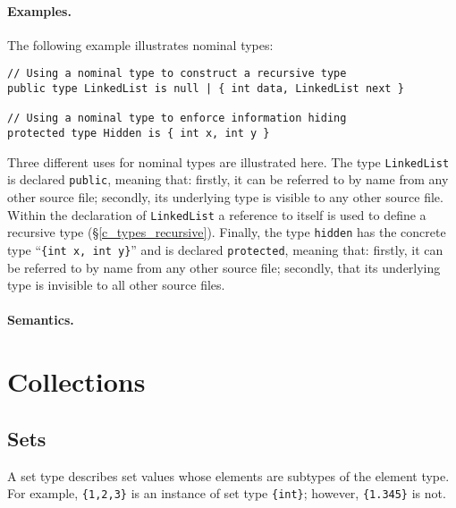 \paragraph{Examples.}  The following example illustrates nominal types:
\begin{lstlisting}
// Using a nominal type to construct a recursive type
public type LinkedList is null | { int data, LinkedList next }

// Using a nominal type to enforce information hiding
protected type Hidden is { int x, int y }
\end{lstlisting}
Three different uses for nominal types are illustrated here.  The type \lstinline{LinkedList} is declared \lstinline{public}, meaning that: firstly, it can be referred to by name from any other source file; secondly, its underlying type is visible to any other source file.  Within the declaration of \lstinline{LinkedList} a reference to itself is used to define a recursive type (\S\ref{c_types_recursive}).  Finally, the type \lstinline{hidden} has the concrete type ``\lstinline|{int x, int y}|'' and is declared \lstinline{protected}, meaning that: firstly, it can be referred to by name from any other source file; secondly,  that its underlying type is invisible to all other source files.

\paragraph{Semantics.}


\section{Collections}
\label{c_types_collection}


\subsection{Sets}
\label{c_types_set}

A set type describes set values whose elements are subtypes of the element type. For example, \lstinline|{1,2,3}| is an instance of set type \lstinline|{int}|; however, \lstinline|{1.345}| is not.

